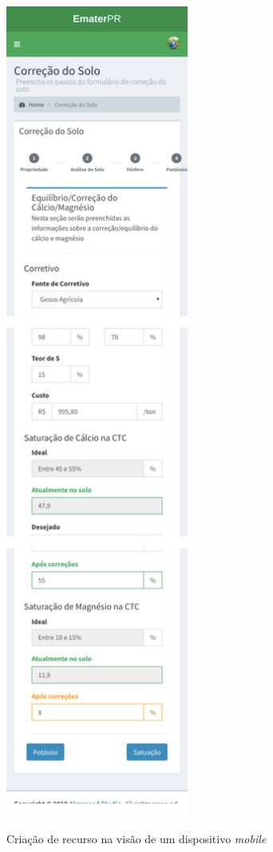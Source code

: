 \begin{figure}[H]
    \centering
    \caption{Criação de recurso na visão de um dispositivo \textit{mobile}}
    \includegraphics[width=6cm]{./dados/figuras/prototipos/create_mobile.png}
    \label{fig:prototipo_create_mobile}
\end{figure}


